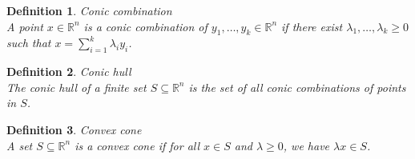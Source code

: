\documentclass[11pt]{book} %
\newtheorem{definition}{Definition}[section]
\begin{document}
\begin{definition}{Conic combination} \\
A point $x \in \mathbb{R}^n$ is a conic combination of $y_1, \ldots, y_k \in \mathbb{R}^n$ 
if there exist $\lambda_1, \ldots, \lambda_k \geq 0$ such that $x = \sum_{i=1}^k \lambda_i y_i$.    
\end{definition}

\begin{definition}{Conic hull} \\
The conic hull of a finite set $S \subseteq \mathbb{R}^n$ is the set of all conic combinations of points in $S$.
\end{definition}


\begin{definition}{Convex cone} \\
A set $S \subseteq \mathbb{R}^n$ is a convex cone if for all $x \in S$ and $\lambda \geq 0$, we have $\lambda x \in S$.
\end{definition}
\end{document}
